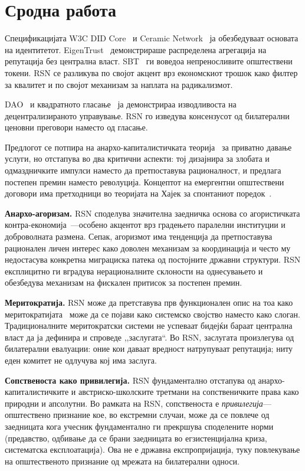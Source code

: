 \documentclass[11pt,a4paper,twocolumn]{article}
\begin{document}
\section{Сродна работа}

Спецификацијата W3C DID Core~\cite{did2022} и Ceramic Network~\cite{ceramic2023} ја обезбедуваат основата на идентитетот. EigenTrust~\cite{kamvar2003} демонстрираше распределена агрегација на репутација без централна власт. SBT~\cite{weyl2022} ги воведоа непреносливите општествени токени. RSN се разликува по својот акцент врз економскиот трошок како филтер за квалитет и по својот механизам за наплата на радикализмот.

DAO~\cite{buterin2014} и квадратното гласање~\cite{buterin2019} ја демонстрираа изводливоста на децентрализираното управување. RSN го изведува консензусот од билатерални ценовни преговори наместо од гласање.

Предлогот се потпира на анархо-капиталистичката теорија~\cite{rothbard1973,hoppe2001} за приватно давање услуги, но отстапува во два критични аспекти: тој дизајнира за злобата и одмаздничките импулси наместо да претпоставува рационалност, и предлага постепен премин наместо револуција. Концептот на емергентни општествени договори има претходници во теоријата на Хајек за спонтаниот поредок~\cite{hayek1973}.

\textbf{Анархо-агоризам.} RSN споделува значителна заедничка основа со агористичката контра-економија~\cite{konkin2006}---особено акцентот врз градењето паралелни институции и доброволната размена. Сепак, агоризмот има тенденција да претпоставува рационален личен интерес како доволен механизам за координација и често му недостасува конкретна миграциска патека од постојните државни структури. RSN експлицитно ги вградува нерационалните склоности на однесувањето и обезбедува механизам на фискален притисок за постепен премин.

\textbf{Меритократија.} RSN може да претставува прв функционален опис на тоа како меритократијата~\cite{young1958} може да се појави како системско својство наместо како слоган. Традиционалните меритократски системи не успеваат бидејќи бараат централна власт да ја дефинира и спроведе ,,заслугата``. Во RSN, заслугата произлегува од билатерални евалуации: оние кои даваат вредност натрупуваат репутација; ниту еден комитет не одлучува кој има заслуга.

\textbf{Сопственоста како привилегија.} RSN фундаментално отстапува од анархо-капиталистичките и австриско-школските третмани на сопственичките права како природни и апсолутни. Во рамката на RSN, сопственоста е \emph{привилегија}---општествено признание кое, во екстремни случаи, може да се повлече од заедницата кога учесник фундаментално ги прекршува споделените норми (предавство, одбивање да се брани заедницата во егзистенцијална криза, систематска експлоатација). Ова не е државна експропријација, туку повлекување на општественото признание од мрежата на билатерални односи.
\end{document}
